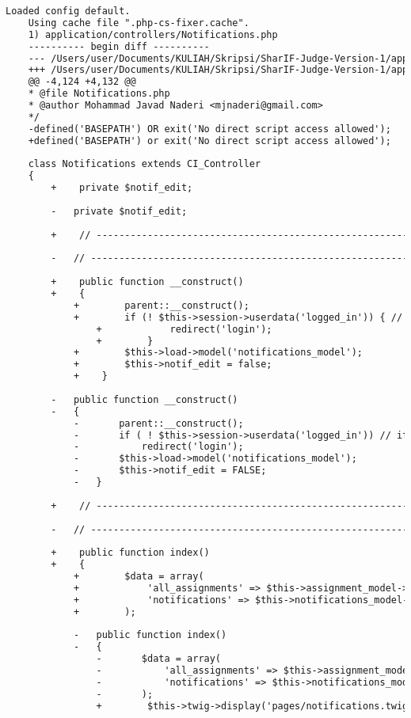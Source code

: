 \begin{lstlisting}[language=diff, caption=Perubahan pada kode Notifications.php]
	Loaded config default.
	Using cache file ".php-cs-fixer.cache".
	1) application/controllers/Notifications.php
	---------- begin diff ----------
	--- /Users/user/Documents/KULIAH/Skripsi/SharIF-Judge-Version-1/application/controllers/Notifications.php
	+++ /Users/user/Documents/KULIAH/Skripsi/SharIF-Judge-Version-1/application/controllers/Notifications.php
	@@ -4,124 +4,132 @@
	* @file Notifications.php
	* @author Mohammad Javad Naderi <mjnaderi@gmail.com>
	*/
	-defined('BASEPATH') OR exit('No direct script access allowed');
	+defined('BASEPATH') or exit('No direct script access allowed');
	
	class Notifications extends CI_Controller
	{
		+    private $notif_edit;
		
		-	private $notif_edit;
		
		+    // ------------------------------------------------------------------------
		
		-	// ------------------------------------------------------------------------
		
		+    public function __construct()
		+    {
			+        parent::__construct();
			+        if (! $this->session->userdata('logged_in')) { // if not logged in
				+            redirect('login');
				+        }
			+        $this->load->model('notifications_model');
			+        $this->notif_edit = false;
			+    }
		
		-	public function __construct()
		-	{
			-		parent::__construct();
			-		if ( ! $this->session->userdata('logged_in')) // if not logged in
			-			redirect('login');
			-		$this->load->model('notifications_model');
			-		$this->notif_edit = FALSE;
			-	}
		
		+    // ------------------------------------------------------------------------
		
		-	// ------------------------------------------------------------------------
		
		+    public function index()
		+    {
			+        $data = array(
			+            'all_assignments' => $this->assignment_model->all_assignments(),
			+            'notifications' => $this->notifications_model->get_all_notifications()
			+        );
			
			-	public function index()
			-	{
				-		$data = array(
				-			'all_assignments' => $this->assignment_model->all_assignments(),
				-			'notifications' => $this->notifications_model->get_all_notifications()
				-		);
				+        $this->twig->display('pages/notifications.twig', $data);
				

\end{lstlisting}
